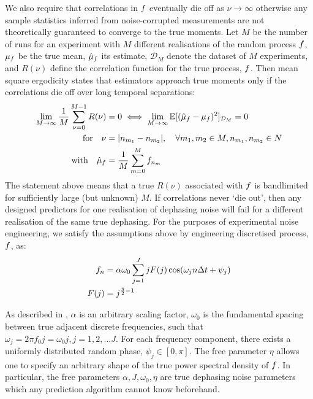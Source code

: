 We also require that correlations in $f$ eventually die off as $\nu \to \infty$ otherwise any sample statistics inferred from noise-corrupted measurements are not theoretically guaranteed to converge to the true moments. Let $M$ be the number of runs for an experiment with $M$ different realisations of the random process $f$, $\mu_f$ be the true mean, $\hat{\mu}_f$ its estimate, $\mathcal{D}_M$ denote the dataset of $M$ experiments, and $R(\nu)$ define the correlation function for the true process, $f$. Then mean square ergodicity states that estimators approach true moments only if the correlations die off over long temporal separations:
\begin{align}
 \lim_{M \to \infty} \frac{1}{M} \sum_{\nu=0}^{M-1} R(\nu) & = 0  \iff  \lim_{M \to \infty} \mathbb{E}[(\hat{\mu}_f  - \mu_f )^2]_{\mathcal{D}_M} = 0 \nonumber \\
\text{for} \quad \nu &= |n_{m_1} - n_{m_2}|, \quad \forall m_1, m_2 \in M, n_{m_1}, n_{m_2} \in N  \nonumber \\
\text{with} \quad \hat{\mu}_f  &= \frac{1}{M} \sum_{m=0}^M f_{n_m} \quad   \label{eqn:app:f_msergodic}  
\end{align}
The statement above means that a true $R(\nu)$ associated with $f$ is bandlimited for sufficiently large (but unknown) $M$. If correlations never `die out', then any designed predictors for one realisation of dephasing noise will fail for a different realisation of the same true dephasing. For the purposes of experimental noise engineering, we satisfy the assumptions above by engineering discretised process, $f$, as:
\begin{align}
f_n &= \alpha \omega_0 \sum_{j=1}^{J} j F(j)\cos(\omega_j n \Delta t + \psi_j) \label{eqn:app:noiseengineering} \\
F(j) & = j^{\frac{\eta}{2}-1}  
\end{align}

As described in \cite{soare2014}, $\alpha$ is an arbitrary scaling factor, $\omega_0$ is the fundamental spacing between true adjacent discrete frequencies, such that $\omega_j = 2 \pi f_0 j =\omega_0 j, j = 1, 2, ...J$. For each frequency component, there exists a uniformly distributed random phase, $\psi_j \in [0, \pi]$. The free parameter $\eta$ allows one to specify an arbitrary shape of the true power spectral density of $f$. In particular, the free parameters $\alpha, J, \omega_0, \eta$ are true dephasing noise parameters which any prediction algorithm cannot know beforehand.

